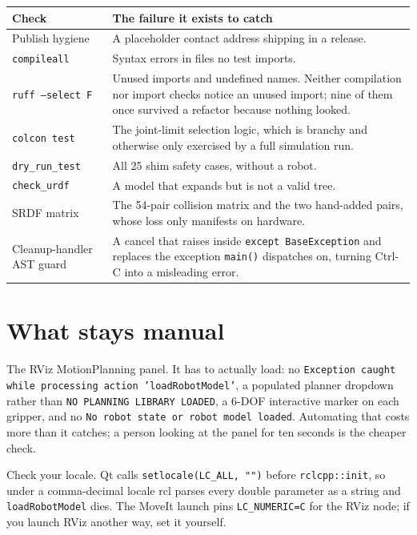 \begin{table}[h]
\centering
\small
\begin{tabularx}{\linewidth}{@{}lX@{}}
\toprule
\textbf{Check} & \textbf{The failure it exists to catch} \\
\midrule
Publish hygiene & A placeholder contact address shipping in a release. \\
\texttt{compileall} & Syntax errors in files no test imports. \\
\texttt{ruff --select F} & Unused imports and undefined names. Neither compilation nor import checks notice an unused import; nine of them once survived a refactor because nothing looked. \\
\texttt{colcon test} & The joint-limit selection logic, which is branchy and otherwise only exercised by a full simulation run. \\
\texttt{dry\_run\_test} & All 25 shim safety cases, without a robot. \\
\texttt{check\_urdf} & A model that expands but is not a valid tree. \\
SRDF matrix & The 54-pair collision matrix and the two hand-added pairs, whose loss only manifests on hardware. \\
Cleanup-handler AST guard & A cancel that raises inside \texttt{except BaseException} and replaces the exception \texttt{main()} dispatches on, turning Ctrl-C into a misleading error. \\
\bottomrule
\end{tabularx}
\end{table}

\section{What stays manual}

The RViz MotionPlanning panel. It has to actually load: no
\texttt{Exception caught while processing action 'loadRobotModel'}, a populated
planner dropdown rather than \texttt{NO PLANNING LIBRARY LOADED}, a 6-DOF
interactive marker on each gripper, and no \texttt{No robot state or robot model
loaded}. Automating that costs more than it catches; a person looking at the
panel for ten seconds is the cheaper check.

\begin{safetybox}
Check your locale. Qt calls \texttt{setlocale(LC\_ALL, "")} before
\texttt{rclcpp::init}, so under a comma-decimal locale rcl parses every double
parameter as a string and \texttt{loadRobotModel} dies. The MoveIt launch pins
\texttt{LC\_NUMERIC=C} for the RViz node; if you launch RViz another way, set it
yourself.
\end{safetybox}

